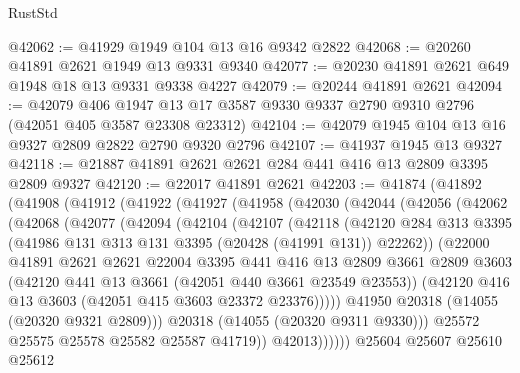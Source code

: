 \begin{lexlean}{RustStd}
\begin{coremodule}
@42062 := @41929 @1949 @104 @13 @16 @9342 @2822
@42068 := @20260 @41891 @2621 @1949 @13 @9331 @9340
@42077 := @20230 @41891 @2621 @649 @1948 @18 @13 @9331 @9338 @4227
@42079 := @20244 @41891 @2621
@42094 := @42079
    @406
    @1947
    @13
    @17
    @3587
    @9330
    @9337
    @2790
    @9310
    @2796
    (@42051 @405 @3587 @23308 @23312)
@42104 := @42079 @1945 @104 @13 @16 @9327 @2809 @2822 @2790 @9320 @2796
@42107 := @41937 @1945 @13 @9327
@42118 := @21887 @41891 @2621 @2621 @284 @441 @416 @13 @2809 @3395 @2809 @9327
@42120 := @22017 @41891 @2621
@42203 := @41874
    (@41892
      (@41908
        (@41912
          (@41922
            (@41927
              (@41958
                (@42030
                  (@42044
                    (@42056
                      (@42062
                        (@42068
                          (@42077
                            (@42094
                              (@42104
                                (@42107
                                  (@42118
                                    (@42120
                                      @284
                                      @313
                                      @3395
                                      (@41986 @131 @313 @131 @3395 (@20428 (@41991 @131)) @22262))
                                    (@22000
                                      @41891
                                      @2621
                                      @2621
                                      @22004
                                      @3395
                                      @441
                                      @416
                                      @13
                                      @2809
                                      @3661
                                      @2809
                                      @3603
                                      (@42120 @441 @13 @3661 (@42051 @440 @3661 @23549 @23553))
                                      (@42120 @416 @13 @3603 (@42051 @415 @3603 @23372 @23376)))))
                                @41950
                                @20318
                                (@14055 (@20320 @9321 @2809)))
                              @20318
                              (@14055 (@20320 @9311 @9330)))
                            @25572
                            @25575
                            @25578
                            @25582
                            @25587
                            @41719))
                        @42013))))))
            @25604
            @25607
            @25610
            @25612

\end{coremodule}
\end{lexlean}
